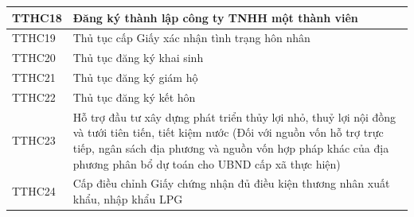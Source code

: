 \begin{longtable}{|>{\centering\arraybackslash}p{2.3cm}|p{12.6cm}|}
TTHC18 & Đăng ký thành lập công ty TNHH một thành viên \\ \hline
TTHC19 & Thủ tục cấp Giấy xác nhận tình trạng hôn nhân \\ \hline
TTHC20 & Thủ tục đăng ký khai sinh \\ \hline
TTHC21 & Thủ tục đăng ký giám hộ \\ \hline
TTHC22 & Thủ tục đăng ký kết hôn \\ \hline
TTHC23 & Hỗ trợ đầu tư xây dựng phát triển thủy lợi nhỏ, thuỷ lợi nội đồng và tưới tiên tiến, tiết kiệm nước (Đối với nguồn vốn hỗ trợ trực tiếp, ngân sách địa phương và nguồn vốn hợp pháp khác của địa phương phân bổ dự toán cho UBND cấp xã thực hiện) \\ \hline
TTHC24 & Cấp điều chỉnh Giấy chứng nhận đủ điều kiện thương nhân xuất khẩu, nhập khẩu LPG \\ \hline
\end{longtable}
